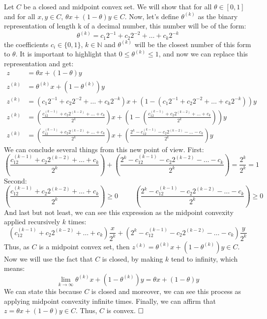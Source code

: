 \documentclass[12pt, oneside]{article}%
\def\N{{\mathbb N}}
\begin{document}
\begin{enumerate}[font=\bfseries]
Let $C$ be a closed and midpoint convex set. We will show that for all $\theta\in [0,1]$ and for all $x,y \in C $, $\theta x + (1-\theta)y \in C$. Now, let's define $\theta^{(k)}$ as the binary representation of length k of a decimal number, this number will be of the form: 
$$\theta^{(k)}=c_1 2^{-1}+c_2 2^{-2}+\dots + c_k 2^{-k}$$
the coefficients $c_i\in \{0,1\}$, $k\in\N$ and $\theta^{(k)}$ will be the closest number of this form to $\theta$. It is important to highlight that $0\leq\theta^{(k)}\leq1$, and now we can replace this representation and get:
\begin{align*}
    z &= \theta x + (1-\theta)y\\
    z^{(k)} &= \theta^{(k)} x + (1-\theta^{(k)})y\\
    z^{(k)} &= (c_1 2^{-1}+c_2 2^{-2}+\dots + c_k 2^{-k}) x + (1-(c_1 2^{-1}+c_2 2^{-2}+\dots + c_k 2^{-k}))y\\
    z^{(k)} &= \left(\frac{c_12^{(k-1)}+c_2 2^{(k-2)}+\dots + c_k}{2^k}\right) x + \left(1-\left(\frac{c_12^{(k-1)}+c_2 2^{(k-2)}+\dots + c_k}{2^k}\right)\right)y\\
    z^{(k)} &= \left(\frac{c_12^{(k-1)}+c_2 2^{(k-2)}+\dots + c_k}{2^k}\right) x + \left(\frac{2^k-c_12^{(k-1)}-c_2 2^{(k-2)}-\dots - c_k}{2^k}\right)y
\end{align*}
We can conclude several things from this new point of view. First:
$$\left(\frac{c_12^{(k-1)}+c_2 2^{(k-2)}+\dots + c_k}{2^k}\right) + \left(\frac{2^k-c_12^{(k-1)}-c_2 2^{(k-2)}-\dots - c_k}{2^k}\right)=\frac{2^k}{2^k}=1$$
Second:
$$\left(\frac{c_12^{(k-1)}+c_2 2^{(k-2)}+\dots + c_k}{2^k}\right)\geq0 \hspace{1cm} \left(\frac{2^k-c_12^{(k-1)}-c_2 2^{(k-2)}-\dots - c_k}{2^k}\right)\geq0$$
And last but not least, we can see this expression as the midpoint convexity applied recursively $k$ times:
$$(c_12^{(k-1)}+c_2 2^{(k-2)}+\dots + c_k)\frac{x}{2^k} + (2^k-c_12^{(k-1)}-c_2 2^{(k-2)}-\dots - c_k)\frac{y}{2^k}$$
Thus, as $C$ is a midpoint convex set, then $z^{(k)} = \theta^{(k)} x + (1-\theta^{(k)})y \in C$. Now we will use the fact that $C$ is closed, by making $k$ tend to infinity, which means:
$$ \lim_{k \to \infty} \theta^{(k)} x + (1-\theta^{(k)})y = \theta x + (1-\theta)y $$
We can state this because $C$ is closed and moreover, we can see this process as applying midpoint convexity infinite times. Finally, we can affirm that $z=\theta x + (1-\theta)y\in C$. Thus, $C$ is convex.\newline
    \hspace*{0pt}\hfill $\hfill\square$


\end{enumerate}
\end{document}
